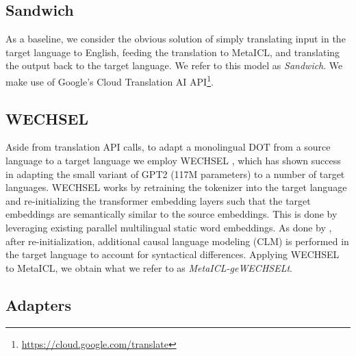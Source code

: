 \documentclass[11pt]{article}
\begin{document}
\subsection{Sandwich}

As a baseline, we consider the obvious solution of simply translating input in the target language
to English, feeding the translation to MetaICL, and translating the output back to the target
language. We refer to this model as \textit{Sandwich}. We make use of Google's Cloud Translation AI
API\footnote{\href{https://cloud.google.com/translate}{https://cloud.google.com/translate}}.

\subsection{WECHSEL}

Aside from translation API calls, to adapt a monolingual DOT from a source language to a target
language we employ WECHSEL \citep{minixhofer_wechsel_2022}, which has shown success in adapting the
small variant of GPT2 (117M parameters) to a number of target languages. WECHSEL works by retraining
the tokenizer into the target language and re-initializing the transformer embedding layers such
that the target embeddings are semantically similar to the source embeddings. This is done by
leveraging existing parallel multilingual static word embeddings. As done by
\citet{de_vries_adapting_2021}, after re-initialization, additional causal language modeling (CLM)
is performed in the target language to account for syntactical differences. Applying WECHSEL to
MetaICL, we obtain what we refer to as \textit{MetaICL-geWECHSELt}.

\subsection{Adapters}\label{sec:method:adapters}
\end{document}
